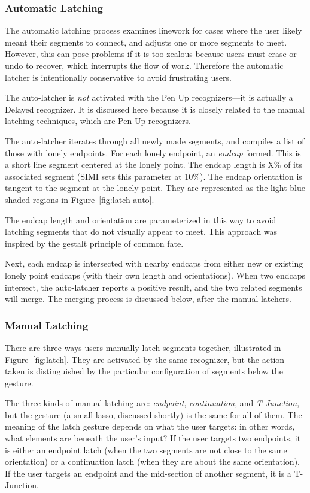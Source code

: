 \subsubsection{Automatic Latching}

The automatic latching process examines linework for cases where the
user likely meant their segments to connect, and adjusts one or more
segments to meet. However, this can pose problems if it is too zealous
because users must erase or undo to recover, which interrupts the flow
of work. Therefore the automatic latcher is intentionally conservative
to avoid frustrating users.

The auto-latcher is \textit{not} activated with the Pen Up
recognizers---it is actually a Delayed recognizer. It is discussed
here because it is closely related to the manual latching techniques,
which are Pen Up recognizers.

The auto-latcher iterates through all newly made segments, and
compiles a list of those with lonely endpoints. For each lonely
endpoint, an \textit{endcap} formed. This is a short line segment
centered at the lonely point. The endcap length is X\% of its
associated segment (SIMI sets this parameter at 10\%). The endcap
orientation is tangent to the segment at the lonely point. They are
represented as the light blue shaded regions in
Figure~\ref{fig:latch-auto}.

The endcap length and orientation are parameterized in this way to
avoid latching segments that do not visually appear to meet. This
approach was inspired by the gestalt principle of common fate.

Next, each endcap is intersected with nearby endcaps from either new
or existing lonely point endcaps (with their own length and
orientations). When two endcaps intersect, the auto-latcher reports a
positive result, and the two related segments will merge. The merging
process is discussed below, after the manual latchers.

\subsubsection{Manual Latching}

There are three ways users manually latch segments together,
illustrated in Figure~\ref{fig:latch}. They are activated by the same
recognizer, but the action taken is distinguished by the particular
configuration of segments below the gesture.

The three kinds of manual latching are: \textit{endpoint},
\textit{continuation}, and \textit{T-Junction}, but the gesture (a
small lasso, discussed shortly) is the same for all of them. The
meaning of the latch gesture depends on what the user targets: in
other words, what elements are beneath the user's input? If the user
targets two endpoints, it is either an endpoint latch (when the two
segments are not close to the same orientation) or a continuation
latch (when they are about the same orientation). If the user targets
an endpoint and the mid-section of another segment, it is a
T-Junction.

